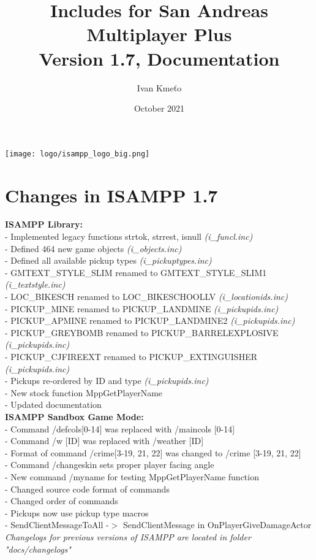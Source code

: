 \documentclass{article}
\title{Includes for San Andreas Multiplayer Plus\\Version 1.7, Documentation}
\author{Ivan Kmeťo}
\date{October 2021}
\begin{document}
\maketitle
\begin{center}
\texttt{[image: logo/isampp\_logo\_big.png]}
\end{center}

\newpage
\tableofcontents

\newpage
\section{Changes in ISAMPP 1.7}
\textbf{ISAMPP Library:}
\\- Implemented legacy functions strtok, strrest, isnull \textit{(i\_funcl.inc)}
\\- Defined 464 new game objects \textit{(i\_objects.inc)}
\\- Defined all available pickup types \textit{(i\_pickuptypes.inc)}
\\- GMTEXT\_STYLE\_SLIM renamed to GMTEXT\_STYLE\_SLIM1 \textit{(i\_textstyle.inc)}
\\- LOC\_BIKESCH renamed to LOC\_BIKESCHOOLLV \textit{(i\_locationids.inc)}
\\- PICKUP\_MINE renamed to PICKUP\_LANDMINE \textit{(i\_pickupids.inc)}
\\- PICKUP\_APMINE renamed to PICKUP\_LANDMINE2 \textit{(i\_pickupids.inc)}
\\- PICKUP\_GREYBOMB renamed to PICKUP\_BARRELEXPLOSIVE \textit{(i\_pickupids.inc)}
\\- PICKUP\_CJFIREEXT renamed to PICKUP\_EXTINGUISHER \textit{(i\_pickupids.inc)}
\\- Pickups re-ordered by ID and type \textit{(i\_pickupids.inc)}
\\- New stock function MppGetPlayerName
\\- Updated documentation
\bigskip
\\\textbf{ISAMPP Sandbox Game Mode:}
\\- Command /defcols[0-14] was replaced with /maincols [0-14]
\\- Command /w [ID] was replaced with /weather [ID]
\\- Format of command /crime[3-19, 21, 22] was changed to /crime [3-19, 21, 22]
\\- Command /changeskin sets proper player facing angle
\\- New command /myname for testing MppGetPlayerName function
\\- Changed source code format of commands
\\- Changed order of commands
\\- Pickups now use pickup type macros
\\- SendClientMessageToAll -$>$ SendClientMessage in OnPlayerGiveDamageActor
\bigskip
\\\textit{Changelogs for previous versions of ISAMPP are located in folder "docs/changelogs"}
\end{document}
